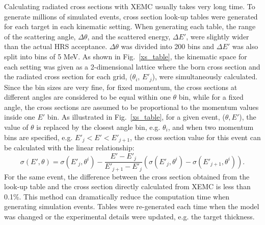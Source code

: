  Calculating radiated cross sections with XEMC usually takes very long time. To generate millions of simulated events, cross section look-up tables were generated for each target in each kinematic setting. When generating each table, the range of the scattering angle, $\Delta\theta$, and the scattered energy, $\Delta E'$, were slightly wider than the actual HRS acceptance. $\Delta\theta$ was divided into 200 bins and $\Delta E'$ was also split into bins of 5 MeV. As shown in Fig.~\ref{xs_table}, the kinematic space for each setting was given as a 2-dimensional lattice where the born cross section and the radiated cross section for each grid, ($\theta_{i}$, $E'_{j}$), were simultaneously calculated. Since the bin sizes are very fine, for fixed momentum, the cross sections at different angles are considered to be equal within one $\theta$ bin, while for a fixed angle, the cross sections are assumed to be proportional to the momentum values inside one $E'$ bin. As illustrated in Fig.~\ref{xs_table}, for a given event, ($\theta,E'$), the value of $\theta$ is replaced by the closest angle bin, e.g. $\theta_{i}$, and when two momentum bins are specified, e.g. $E'_{j}<E'<E'_{j+1}$, the cross section value for this event can be calculated with the linear relationship:
\begin{equation}
  \sigma(E',\theta) = \sigma(E'_{j},\theta^{i}) - \frac{E'-E'_{j}}{E'_{j+1}-E'_{j}}\left(\sigma(E'_{j},\theta^{i})-\sigma(E'_{j+1},\theta^{i})\right).
  \label{xs_lookup_ep}
\end{equation}
For the same event, the difference between the cross section obtained from the look-up table and the cross section directly calculated from XEMC is less than 0.1\%. This method can dramatically reduce the computation time when generating simulation events. Tables were re-generated each time when the model was changed or the experimental details were updated, e.g. the target thickness.
